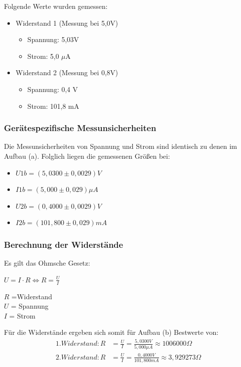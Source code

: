 \documentclass[
  9pt,
]{article}
\begin{document}
Folgende Werte wurden gemessen:

\begin{itemize}
\item {Widerstand 1 (Messung bei 5,0V)}
\begin{itemize}
\item {Spannung: 5,03V}
\item {Strom: 5,0 $\mu$A}
\end{itemize}
\item {Widerstand 2 (Messung bei 0,8V)}
\begin{itemize}
\item {Spannung: 0,4 V}
\item {Strom: 101,8 mA}
\end{itemize}
\end{itemize}

\hypertarget{geruxe4tespezifische-messunsicherheiten-1}{%
\subsubsection{Gerätespezifische
Messunsicherheiten}\label{geruxe4tespezifische-messunsicherheiten-1}}

Die Messunsicherheiten von Spannung und Strom sind identisch zu denen im
Aufbau (a). Folglich liegen die gemessenen Größen bei:

\begin{itemize}
\item $U1b = (5,0300 \pm 0,0029)V$
\item $I1b = (5,000 \pm 0,029) \mu A$
\item $U2b = (0,4000 \pm 0,0029)V$
\item $I2b = (101,800 \pm 0,029) mA$
\end{itemize}

\hypertarget{berechnung-der-widerstuxe4nde-1}{%
\subsubsection{Berechnung der
Widerstände}\label{berechnung-der-widerstuxe4nde-1}}

Es gilt das Ohmsche Gesetz:

\(U=I\cdot R \Leftrightarrow R = \frac{U}{I}\)

\noindent \(R\) =Widerstand\\
\noindent \(U\) = Spannung\\
\noindent \(I\) = Strom

Für die Widerstände ergeben sich somit für Aufbau (b) Bestwerte von:
\begin{equation*}
\begin{split}
1. Widerstand: R&=\frac{U}{I} = \frac {5,0300V}{5,000 \mu A} \approx 1006000 \Omega \\
2.Widerstand: R&=\frac{U}{I} = \frac {0,4000V}{101,800 mA} \approx 3,929273 \Omega \\
\end{split}
\end{equation*}
\end{document}
